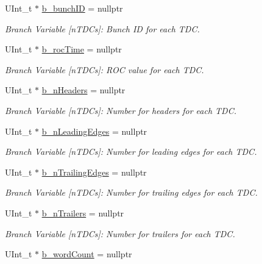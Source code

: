 \begin{DoxyCompactItemize}
U\+Int\+\_\+t $\ast$ \hyperlink{class_event_tree_manager_a4953fdf79783fdd5c0b867af1dbd8f3d}{b\+\_\+bunch\+ID} = nullptr
\begin{DoxyCompactList}\small\item\em Branch Variable \mbox{[}n\+T\+D\+Cs\mbox{]}\+: Bunch ID for each T\+DC. \end{DoxyCompactList}\item 
U\+Int\+\_\+t $\ast$ \hyperlink{class_event_tree_manager_acc8b0c67ad8e331ea9fc3f94a57d072b}{b\+\_\+roc\+Time} = nullptr
\begin{DoxyCompactList}\small\item\em Branch Variable \mbox{[}n\+T\+D\+Cs\mbox{]}\+: R\+OC value for each T\+DC. \end{DoxyCompactList}\item 
U\+Int\+\_\+t $\ast$ \hyperlink{class_event_tree_manager_ac85cc79e72eaec4f7554a10e12e4d75a}{b\+\_\+n\+Headers} = nullptr
\begin{DoxyCompactList}\small\item\em Branch Variable \mbox{[}n\+T\+D\+Cs\mbox{]}\+: Number for headers for each T\+DC. \end{DoxyCompactList}\item 
U\+Int\+\_\+t $\ast$ \hyperlink{class_event_tree_manager_ac32836178a53f00fe5417e533a0390f1}{b\+\_\+n\+Leading\+Edges} = nullptr
\begin{DoxyCompactList}\small\item\em Branch Variable \mbox{[}n\+T\+D\+Cs\mbox{]}\+: Number for leading edges for each T\+DC. \end{DoxyCompactList}\item 
U\+Int\+\_\+t $\ast$ \hyperlink{class_event_tree_manager_aabb6a03aaab8095cb3e5e04d8389194a}{b\+\_\+n\+Trailing\+Edges} = nullptr
\begin{DoxyCompactList}\small\item\em Branch Variable \mbox{[}n\+T\+D\+Cs\mbox{]}\+: Number for trailing edges for each T\+DC. \end{DoxyCompactList}\item 
U\+Int\+\_\+t $\ast$ \hyperlink{class_event_tree_manager_ae3d13f63577de75ec8a673ddb8686629}{b\+\_\+n\+Trailers} = nullptr
\begin{DoxyCompactList}\small\item\em Branch Variable \mbox{[}n\+T\+D\+Cs\mbox{]}\+: Number for trailers for each T\+DC. \end{DoxyCompactList}\item 
U\+Int\+\_\+t $\ast$ \hyperlink{class_event_tree_manager_a7151f5beadcec7080e1b95f12e52a40a}{b\+\_\+word\+Count} = nullptr

\end{DoxyCompactItemize}
